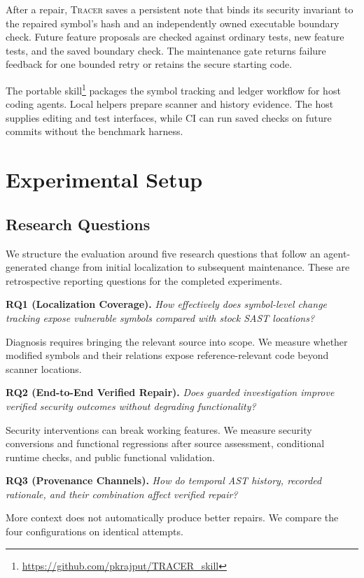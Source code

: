 \documentclass[10pt,conference]{IEEEtran}
\newcommand{\tracer}{\textsc{Tracer}}
\newcommand{\code}[1]{\texttt{\detokenize{#1}}}
\begin{document}
After a repair, \tracer{} saves a persistent note that binds its security invariant to the repaired symbol's hash and an independently owned executable boundary check. Future feature proposals are checked against ordinary tests, new feature tests, and the saved boundary check. The maintenance gate returns failure feedback for one bounded retry or retains the secure starting code.

The portable \code{tracer-security} skill\footnote{\url{https://github.com/pkrajput/TRACER_skill}} packages the symbol tracking and ledger workflow for host coding agents. Local helpers prepare scanner and history evidence. The host supplies editing and test interfaces, while CI can run saved checks on future commits without the benchmark harness.

\section{Experimental Setup}
\label{sec:design}
\subsection{Research Questions}
We structure the evaluation around five research questions that follow an agent-generated change from initial localization to subsequent maintenance. These are retrospective reporting questions for the completed experiments.

\noindent\textbf{RQ1 (Localization Coverage).} \emph{How effectively does symbol-level change tracking expose vulnerable symbols compared with stock SAST locations?}\par
Diagnosis requires bringing the relevant source into scope. We measure whether modified symbols and their relations expose reference-relevant code beyond scanner locations.

\smallskip
\noindent\textbf{RQ2 (End-to-End Verified Repair).} \emph{Does guarded investigation improve verified security outcomes without degrading functionality?}\par
Security interventions can break working features. We measure security conversions and functional regressions after source assessment, conditional runtime checks, and public functional validation.

\smallskip
\noindent\textbf{RQ3 (Provenance Channels).} \emph{How do temporal AST history, recorded rationale, and their combination affect verified repair?}\par
More context does not automatically produce better repairs. We compare the four configurations on identical attempts.
\end{document}
